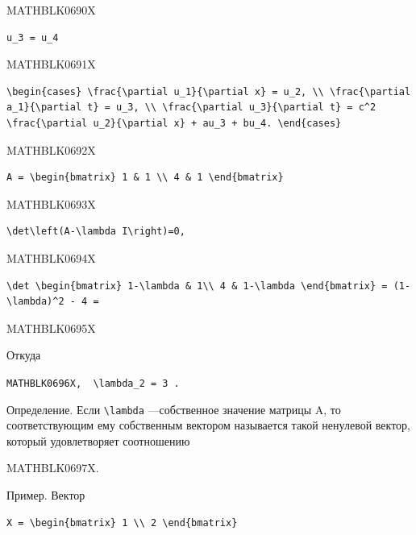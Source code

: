 \documentclass[
  ukrainian,
]{article}
\begin{document}
MATHBLK0690X

\begin{verbatim}
u_3 = u_4
\end{verbatim}

MATHBLK0691X

\begin{verbatim}
\begin{cases} \frac{\partial u_1}{\partial x} = u_2, \\ \frac{\partial a_1}{\partial t} = u_3, \\ \frac{\partial u_3}{\partial t} = c^2 \frac{\partial u_2}{\partial x} + au_3 + bu_4. \end{cases}
\end{verbatim}

MATHBLK0692X

\begin{verbatim}
A = \begin{bmatrix} 1 & 1 \\ 4 & 1 \end{bmatrix}
\end{verbatim}

MATHBLK0693X

\begin{verbatim}
\det\left(A-\lambda I\right)=0,
\end{verbatim}

MATHBLK0694X

\begin{verbatim}
\det \begin{bmatrix} 1-\lambda & 1\\ 4 & 1-\lambda \end{bmatrix} = (1-\lambda)^2 - 4 =
\end{verbatim}

MATHBLK0695X

Откуда

\texttt{MATHBLK0696X,\ \ \textquotesingle{}\textbackslash{}lambda\_2\ =\ 3\textquotesingle{}\ .}

Определение. Если \texttt{\textbackslash{}lambda} ---собственное
значение матрицы A, то соответствующим ему собственным вектором
называется такой ненулевой вектор, который удовлетворяет соотношению

MATHBLK0697X.

Пример. Вектор

\begin{verbatim}
X = \begin{bmatrix} 1 \\ 2 \end{bmatrix}
\end{verbatim}
\end{document}
